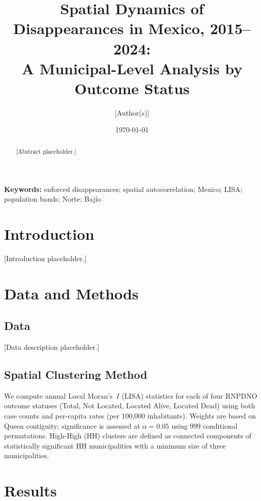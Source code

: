 \documentclass[12pt]{article}
\title{Spatial Dynamics of Disappearances in Mexico, 2015--2024:\\
       A Municipal-Level Analysis by Outcome Status}
\author{[Author(s)]}
\date{\today}
\begin{document}
\maketitle

\begin{abstract}
[Abstract placeholder.]
\end{abstract}

\textbf{Keywords:} enforced disappearances; spatial autocorrelation; Mexico;
LISA; population bands; Norte; Baj\'io

\section{Introduction}

[Introduction placeholder.]

\section{Data and Methods}

\subsection{Data}

[Data description placeholder.]

\subsection{Spatial Clustering Method}

We compute annual Local Moran's~$I$ (LISA) statistics for each of four RNPDNO
outcome statuses (Total, Not Located, Located Alive, Located Dead) using both
case counts and per-capita rates (per 100,000 inhabitants). Weights are based
on Queen contiguity; significance is assessed at $\alpha = 0.05$ using 999
conditional permutations. High-High (HH) clusters are defined as connected
components of statistically significant HH municipalities with a minimum size
of three municipalities.

\section{Results}
\end{document}
